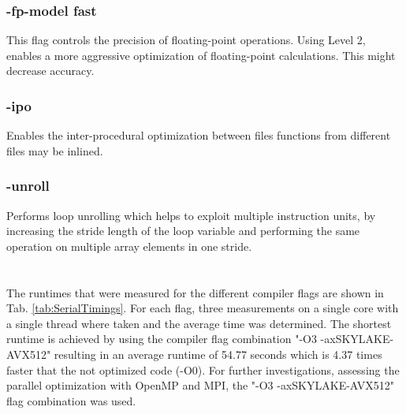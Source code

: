 \documentclass[a4paper, 11pt, oneside]{scrartcl}
\newcommand{\refTab}[1]{Tab. \ref{#1}}
\begin{document}
\subsubsection*{-fp-model fast}
This flag controls the precision of floating-point operations. Using Level 2, enables a more aggressive optimization of floating-point calculations. This might decrease accuracy.

\subsubsection*{-ipo}
Enables the inter-procedural optimization between files functions from different files may be inlined.

\subsubsection*{-unroll}
Performs loop unrolling which helps to exploit multiple instruction units, by increasing the stride length of the loop variable and performing the same operation on multiple array elements in one stride. 
\\
\citep{anmeyRWTHHPCClusterUser, behrLectureParallelComputing, QuickReferenceGuide, IntelCompilerClassic2022}
\\
\\
The runtimes that were measured for the different compiler flags are shown in \refTab{tab:SerialTimings}. For each flag, three measurements on a single core with a single thread where taken and the average time was determined. The shortest runtime is achieved by using the compiler flag combination "-O3 -axSKYLAKE-AVX512" resulting in an average runtime of 54.77 seconds which is 4.37 times faster that the not optimized code (-O0). For further investigations, assessing the parallel optimization with OpenMP and MPI, the "-O3 -axSKYLAKE-AVX512" flag combination was used.
\end{document}
